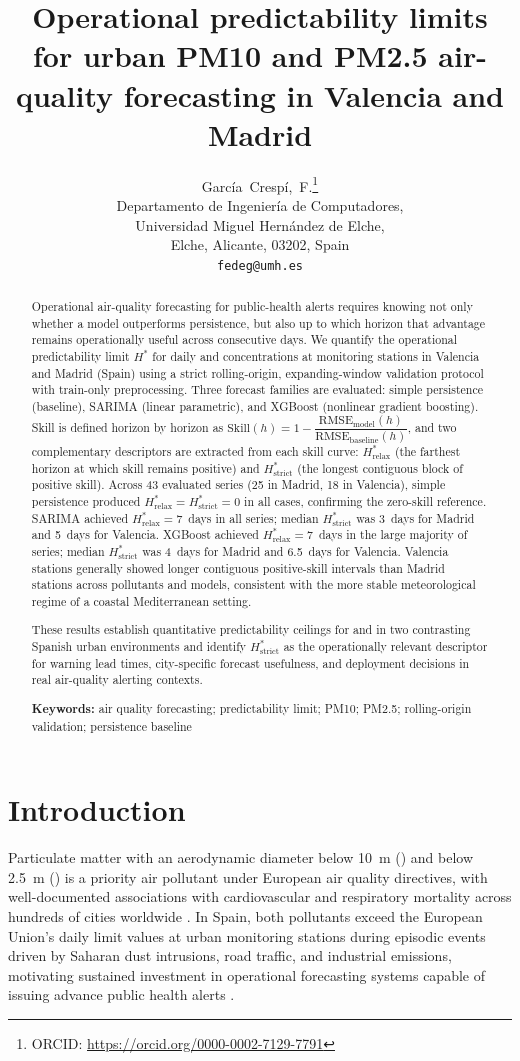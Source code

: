 \documentclass[12pt, a4paper]{article}
\title{Operational predictability limits for urban PM10 and PM2.5 air-quality forecasting in Valencia and Madrid}
\author{
  Garc{\'i}a~Cresp{\'i},~F.\footnote{ORCID: \url{https://orcid.org/0000-0002-7129-7791}}\\
  \small Departamento de Ingenier{\'i}a de Computadores,\\
  \small Universidad Miguel Hern{\'a}ndez de Elche,\\
  \small Elche, Alicante, 03202, Spain\\
  \small \texttt{fedeg@umh.es}
}
\date{}
\newcommand{\Hstar}{H^{*}}
\newcommand{\Hrelax}{H^{*}_{\mathrm{relax}}}
\newcommand{\Hstrict}{H^{*}_{\mathrm{strict}}}
\newcommand{\Skill}{\mathrm{Skill}}
\newcommand{\rmseM}{\mathrm{RMSE}_{\mathrm{model}}}
\newcommand{\rmseB}{\mathrm{RMSE}_{\mathrm{baseline}}}
\newcommand{\skillformula}{\Skill(h) = 1 - \dfrac{\rmseM(h)}{\rmseB(h)}}
\begin{document}
\maketitle

\begin{abstract}
Operational air-quality forecasting for public-health alerts requires
knowing not only whether a model outperforms persistence, but also up
to which horizon that advantage remains operationally useful across
consecutive days.
We quantify the operational predictability limit $\Hstar$ for daily
 and  concentrations at monitoring stations in
Valencia and Madrid (Spain) using a strict rolling-origin,
expanding-window validation protocol with train-only preprocessing.
Three forecast families are evaluated: simple persistence (baseline),
SARIMA (linear parametric), and XGBoost (nonlinear gradient boosting).
Skill is defined horizon by horizon as $\skillformula$, and two
complementary descriptors are extracted from each skill curve:
$\Hrelax$ (the farthest horizon at which skill remains positive) and
$\Hstrict$ (the longest contiguous block of positive skill).
Across 43 evaluated series (25 in Madrid, 18 in Valencia), simple
persistence produced $\Hrelax = \Hstrict = 0$ in all cases, confirming
the zero-skill reference.
SARIMA achieved $\Hrelax = 7$~days in all series; median $\Hstrict$
was 3~days for Madrid and 5~days for Valencia.
XGBoost achieved $\Hrelax = 7$~days in the large majority of series;
median $\Hstrict$ was 4~days for Madrid and 6.5~days for Valencia.
Valencia stations generally showed longer contiguous positive-skill
intervals than Madrid stations across pollutants and models,
consistent with the more stable meteorological regime of a coastal
Mediterranean setting.

These results establish quantitative predictability ceilings
for  and  in two contrasting Spanish urban
environments and identify $\Hstrict$ as the operationally
relevant descriptor for warning lead times, city-specific forecast
usefulness, and deployment decisions in real air-quality alerting
contexts.

\smallskip
\textbf{Keywords:} air quality forecasting; predictability limit;
PM10; PM2.5; rolling-origin validation; persistence baseline
\end{abstract}

\section{Introduction}
Particulate matter with an aerodynamic diameter below 10~\textmu m ()
and below 2.5~\textmu m () is a priority air pollutant
under European air quality directives, with well-documented associations
with cardiovascular and respiratory mortality across hundreds of cities
worldwide \citep{Lelieveld2019, Liu2019}.
In Spain, both pollutants exceed the European Union's daily limit values
at urban monitoring stations during episodic events driven by
Saharan dust intrusions, road traffic, and industrial emissions,
motivating sustained investment in operational forecasting systems
capable of issuing advance public health alerts \citep{Pey2013, Pay2014}.
\end{document}
